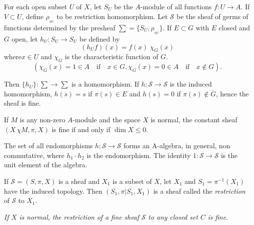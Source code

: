 \begin{exam}%
For each open subset $U$ of $X$, let $S_U$ be the $A$-module of all
functions $f : U \to A$. If $V \subset U$, define $\rho_{_{VU}}$ to be
restriction homomorphism. Let $\mathscr{S}$ be the sheaf of germs of
functions determined by the presheaf $\sum = \{ S_U, \rho_{_{VU}} \}$. If
$E \subset G$ with $E$ closed and $G$ open, let $h_U : S_U \to S_U$ be
defined by 
$$
(h_U f) (x) = f (x) \; \chi_G (x)
$$
where\pageoriginale $x \in U$ and $\chi_G$ is the characteristic
function of $G$. 
$$
(\chi_G (x) =1 \in A \quad \text{if} \quad x \in G,
\chi_G (x) = 0 \in A \quad \text{if} \quad x \notin G).
$$

Then $\{ h_U\}: \sum \to \sum $ is a homomorphism. If $h : \mathscr{S}
\to \mathscr{S}$ is the induced homomorphism, $h (s) =s$ if $\pi (s) 
\in E$  and $h (s) =0 $ if $\pi (s) \notin \bar{G}$, hence the
sheaf is fine. 
\end{exam}

\medskip
{}
If $M$ is any non-zero $A$-module and the space $X$
is normal, the constant sheaf $(X \, \chi M, \pi, X)$ is fine if and only
if $\dim  X \le 0$.  

\begin{note*}%
 The set of all endomorphisms $h : \mathscr{S} \to \mathscr{S}$ forms
 an A-algebra, in general, non commutative, where $h_1 \cdot h_2$ is the
  endomorphism. The identity $1 : \mathscr{S} \to
 \mathscr{S}$ is the unit element of the algebra. 
\end{note*}

If $\mathscr{S} = (S, \pi, X)$ is a sheaf and $X_1$ is a subset of
$X$, let $X_1$ and $S_1 = \pi^{-1} (X_1)$ have the induced
topology. Then $(S_1, \pi |S_1, X_1)$ is a sheaf called the
\textit{restriction} of $\mathscr{S}$ to $X_1$.   

\textit{If $X$ is normal, the restriction of a fine sheaf
  $\mathscr{S}$ to any closed set $C$ is fine}. 

